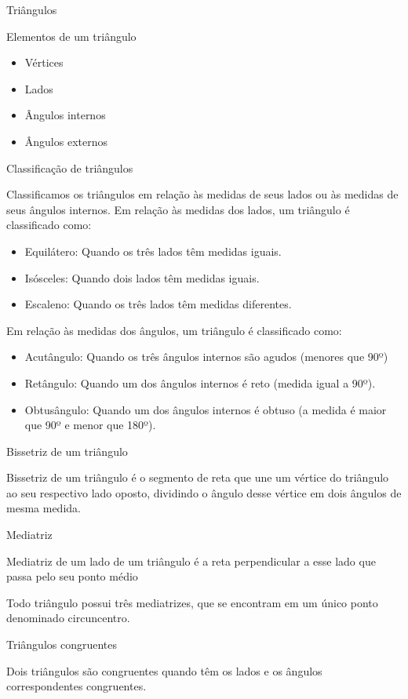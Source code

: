 {Triângulos

Elementos de um triângulo

\begin{itemize}
\item
  Vértices
\item
  Lados
\item
  Ângulos internos
\item
  Ângulos externos
\end{itemize}

Classificação de triângulos

Classificamos os triângulos em relação às medidas de seus lados ou às
medidas de seus ângulos internos. Em relação às medidas dos lados, um
triângulo é classificado como:

\begin{itemize}
\item
  Equilátero: Quando os três lados têm medidas iguais.
\item
  Isósceles: Quando dois lados têm medidas iguais.
\item
  Escaleno: Quando os três lados têm medidas diferentes.
\end{itemize}

Em relação às medidas dos ângulos, um triângulo é classificado como:

\begin{itemize}
\item
  Acutângulo: Quando os três ângulos internos são agudos (menores que
  90º)
\item
  Retângulo: Quando um dos ângulos internos é reto (medida igual a 90º).
\item
  Obtusângulo: Quando um dos ângulos internos é obtuso (a medida é maior
  que 90º e menor que 180º).
\end{itemize}

Bissetriz de um triângulo

Bissetriz de um triângulo é o segmento de reta que une um vértice do
triângulo ao seu respectivo lado oposto, dividindo o ângulo desse
vértice em dois ângulos de mesma medida.

Mediatriz

Mediatriz de um lado de um triângulo é a reta perpendicular a esse lado
que passa pelo seu ponto médio

Todo triângulo possui três mediatrizes, que se encontram em um único
ponto denominado circuncentro.

Triângulos congruentes

Dois triângulos são congruentes quando têm os lados e os ângulos
correspondentes congruentes.

}
